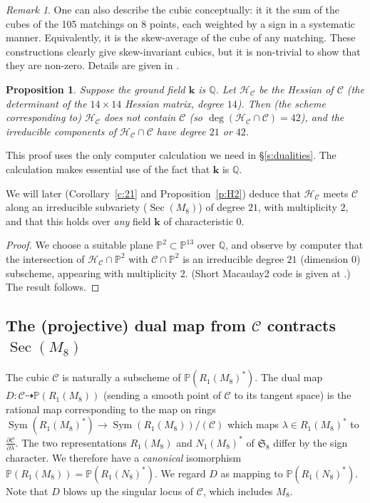 \documentclass{amsart}
\newtheorem{proposition}[theorem]{Proposition}
\theoremstyle{definition}
\theoremstyle{remark}
\newtheorem{remark}[theorem]{\it Remark}
\DeclareMathOperator{\Sym}{Sym}
\DeclareMathOperator{\Sec}{Sec}
\def\SS{\mathfrak{S}}
\def\fieldk{\mathbf{k}}
\def\proj{\mathbb{P}}
\def\Q{\mathbb{Q}}
\def\cubic{\mathcal{C}}
\def\hessian{\mathcal{H}}
\begin{document}
\begin{remark}
One can also describe the cubic conceptually:  it it the sum of the cubes of the 105 matchings on 8 points, each
weighted by a sign in a systematic manner.  Equivalently, it is the skew-average of the cube of any matching.  These
constructions clearly give skew-invariant cubics,  but  it is
non-trivial to show that they are non-zero.  Details are given in \cite[Prop.~3.1]{hmsve}.\label{march10}
\end{remark}

\begin{proposition}
\label{p:gregsmith}
Suppose the ground field $\fieldk$ is $\Q$.  Let $\hessian_{\cubic}$ be the Hessian  of $\cubic$ (the determinant of
the $14 \times 14$ Hessian matrix, degree $14$).  Then (the scheme corresponding to)
$\hessian_{\cubic}$ does not contain $\cubic$ (so $\deg (\hessian_{\cubic} \cap \cubic) = 42$), and the irreducible
components of $\hessian_{\cubic} \cap \cubic$ have degree $21$ or $42$.
\end{proposition}

This proof uses  the only computer calculation we need in \S \ref{s:dualities}.  The calculation makes
essential use of the fact that $\fieldk$ is $\Q$.

We will later (Corollary~\ref{c:21} and Proposition~\ref{p:H2}) deduce that $\hessian_{\cubic}$ meets $\cubic$ along an irreducible subvariety
($\Sec (M_8)$) of degree $21$, with multiplicity $2$, and that this holds over {\em any} field $\fieldk$ of
characteristic $0$.

\begin{proof}
We choose a suitable plane $\proj^2 \subset \proj^{13}$ over $\Q$, and observe by computer that the intersection of
$\hessian_{\cubic} \cap \proj^2$ with $\cubic \cap \proj^2$ is an irreducible degree $21$ (dimension $0$) subscheme,
appearing  with multiplicity $2$.  (Short Macaulay2 code is given at \cite{hmsvcode}.)  The result follows.
\end{proof}


\subsection{The (projective) dual map from $\cubic$ contracts $\Sec(M_8)$}

The cubic $\cubic$ is naturally a subscheme of $\proj(R_1(M_8)^*)$.
The dual map $D: \cubic \dashrightarrow \proj(R_1(M_8))$ (sending a smooth point of $\cubic$ to its tangent space)
is the rational map corresponding to the map on rings $\Sym(R_1(M_8)^*) \to \Sym(R_1(M_8))/(\cubic)$ which maps
$\lambda \in R_1(M_8)^*$ to $\frac{\partial \cubic}{\partial \lambda}$.  The two representations $R_1(M_8)$ and
$N_1(M_8)^*$ of $\SS_8$ differ by the sign character.  We therefore have a \emph{canonical} isomorphism
$\proj(R_1(M_8))=\proj(R_1(N_8)^*)$.  We regard $D$ as mapping to $\proj(R_1(N_8)^*)$.
Note that $D$ blows up the singular locus of $\cubic$, which includes $M_8$.
\end{document}
